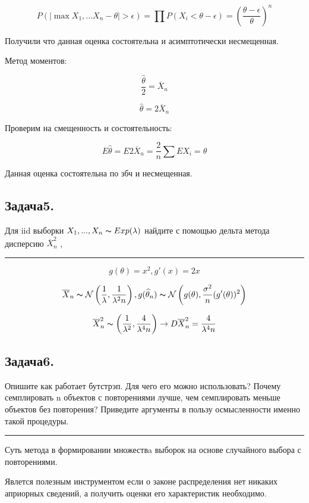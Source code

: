 \documentclass[8pt,reqno]{article}
\theoremstyle{definition}
\theoremstyle{remark}
\newcommand{\lfrac} [2] {\displaystyle \frac{#1}{#2}}
\begin{document}
$$
P\left(|\max{X_1,...X_n} - \theta| > \epsilon \right) = \prod P\left(X_i < \theta - \epsilon\right)  = \left( \lfrac{\theta - \epsilon}{\theta}\right)^n
$$

Получили что данная оценка состоятельна и асимптотически несмещенная.

Метод моментов:

$$
\lfrac{\widehat{\theta}}{2} = \overline{X}_n
$$

$$
\widehat{\theta} = 2\overline{X}_n
$$

Проверим на смещенность и состоятельность:

$$
E \widehat{\theta} = E 2\overline{X}_n = \lfrac{2}{n} \sum{EX_i} = \theta
$$

Данная оценка состоятельна по збч и несмещенная.

\subsection*{Задача5.}

Для iid выборки $X_1,...,X_n \thicksim Exp(\lambda)$ найдите с помощью дельта метода дисперсию $\overline{X}_n^2$ ,

\noindent\rule{8cm}{0.4pt}

$$
g(\theta) = x^2, g'(x) = 2x
$$

$$
\overline{X}_n \thicksim \mathcal{N}\left(\lfrac{1}{\lambda},\lfrac{1}{\lambda^2 n}\right),
g(\widehat{\theta}_n) \thicksim \mathcal{N}\left(g(\theta), \lfrac{\sigma^2}{n}(g'(\theta))^2\right)
$$

$$
\overline{X}^2_n \thicksim \left( \lfrac{1}{\lambda^2}, \lfrac{4}{\lambda^4n}\right) \rightarrow
D\overline{X}_n^2 =  \lfrac{4}{\lambda^4n}
$$


\subsection*{Задача6.}

Опишите как работает бутстрэп. Для чего его можно использовать? Почему семплировать n объектов с повторениями лучше, чем семплировать меньше объектов без повторения? Приведите аргументы в пользу осмысленности именно такой процедуры.

\noindent\rule{8cm}{0.4pt}

Суть метода в формировании множествa выборок на основе случайного выбора с повторениями.

Явлется полезным инструментом если о законе распределения нет никаких априорных сведений, а получить оценки его характеристик необходимо.
\end{document}
